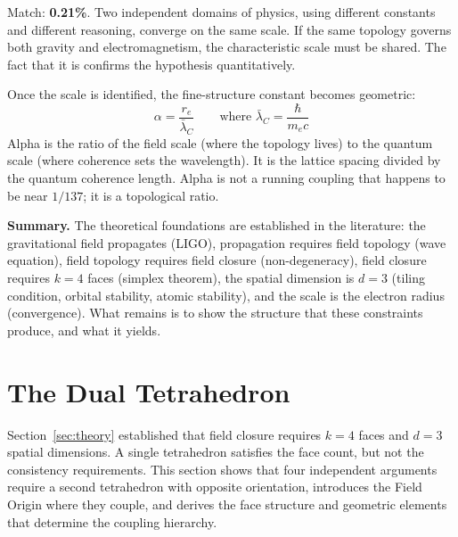 \documentclass[aps,prd,preprint,superscriptaddress,showpacs,preprintnumbers,amsmath,amssymb,nofootinbib]{revtex4-2}
\begin{document}
Match: \textbf{0.21\%}. Two independent domains of physics, using different constants and different reasoning, converge on the same scale. If the same topology governs both gravity and electromagnetism, the characteristic scale must be shared. The fact that it is confirms the hypothesis quantitatively.

Once the scale is identified, the fine-structure constant becomes geometric:
\begin{equation}
\alpha = \frac{r_e}{\bar{\lambda}_C} \qquad \text{where } \bar{\lambda}_C = \frac{\hbar}{m_e c}
\end{equation}
Alpha is the ratio of the field scale (where the topology lives) to the quantum scale (where coherence sets the wavelength). It is the lattice spacing divided by the quantum coherence length. Alpha is not a running coupling that happens to be near $1/137$; it is a topological ratio.

\vspace{1em}
\noindent\textbf{Summary.} The theoretical foundations are established in the literature: the gravitational field propagates (LIGO), propagation requires field topology (wave equation), field topology requires field closure (non-degeneracy), field closure requires $k = 4$ faces (simplex theorem), the spatial dimension is $d = 3$ (tiling condition, orbital stability, atomic stability), and the scale is the electron radius (convergence). What remains is to show the structure that these constraints produce, and what it yields.

\section{The Dual Tetrahedron}
\label{sec:foundation}


Section~\ref{sec:theory} established that field closure requires $k = 4$ faces and $d = 3$ spatial dimensions. A single tetrahedron satisfies the face count, but not the consistency requirements. This section shows that four independent arguments require a second tetrahedron with opposite orientation, introduces the Field Origin where they couple, and derives the face structure and geometric elements that determine the coupling hierarchy.
\end{document}
